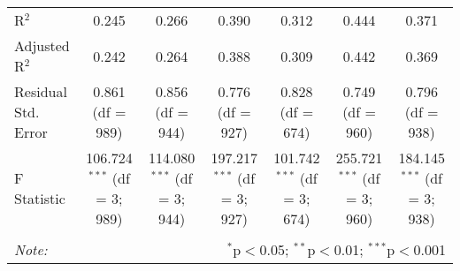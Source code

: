 \begin{table}[!htbp]
\begin{tabular}{@{\extracolsep{5pt}}lcccccc}
R$^{2}$ & 0.245 & 0.266 & 0.390 & 0.312 & 0.444 & 0.371 \\ 
Adjusted R$^{2}$ & 0.242 & 0.264 & 0.388 & 0.309 & 0.442 & 0.369 \\ 
Residual Std. Error & 0.861 (df = 989) & 0.856 (df = 944) & 0.776 (df = 927) & 0.828 (df = 674) & 0.749 (df = 960) & 0.796 (df = 938) \\ 
F Statistic & 106.724$^{***}$ (df = 3; 989) & 114.080$^{***}$ (df = 3; 944) & 197.217$^{***}$ (df = 3; 927) & 101.742$^{***}$ (df = 3; 674) & 255.721$^{***}$ (df = 3; 960) & 184.145$^{***}$ (df = 3; 938) \\ 
\hline 
\hline \\[-1.8ex] 
\textit{Note:}  & \multicolumn{6}{r}{$^{*}$p$<$0.05; $^{**}$p$<$0.01; $^{***}$p$<$0.001} \\ 
\end{tabular} 
\end{table} 
